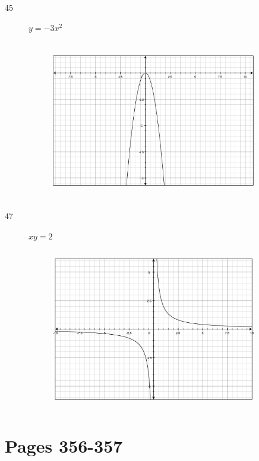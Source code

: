 \documentclass[fleqn,addpoints]{exam}
\begin{document}
\begin{description}
\item[45]
$y= -3x^2$
\begin{figure}[H]
  \includegraphics[width=9cm,height=7cm]{p318/45}
\end{figure}

\item[47]
$xy= 2$
\begin{figure}[H]
  \includegraphics[width=9cm,height=7cm]{p318/47}
\end{figure}

\end{description}

\section{Pages 356-357}
\end{document}
